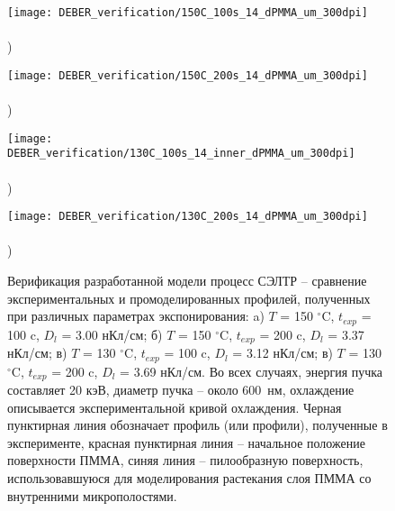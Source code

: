 \begin{figure}[h!]
	\begin{minipage}{0.48\textwidth}
		\texttt{[image: DEBER\_verification/150C\_100s\_14\_dPMMA\_um\_300dpi]} \\
		\vspace{-13em} \\ ) \\ \vspace{13em}
	\end{minipage}
	\begin{minipage}{0.48\textwidth}
		\texttt{[image: DEBER\_verification/150C\_200s\_14\_dPMMA\_um\_300dpi]} \\
		\vspace{-13em} \\ ) \\ \vspace{13em}
	\end{minipage}
	
	\vspace{-3.5em}
	
	\begin{minipage}{0.48\textwidth}
		\texttt{[image: DEBER\_verification/130C\_100s\_14\_inner\_dPMMA\_um\_300dpi]} \\
		\vspace{-13em} \\ ) \\ \vspace{13em}
	\end{minipage}
	\begin{minipage}{0.48\textwidth}
		\texttt{[image: DEBER\_verification/130C\_200s\_14\_dPMMA\_um\_300dpi]} \\
		\vspace{-13em} \\ ) \\ \vspace{13em}
	\end{minipage}
	\vspace{-3em}
	\caption{Верификация разработанной модели процесс СЭЛТР -- сравнение экспериментальных и промоделированных профилей, полученных при различных параметрах экспонирования: a) $T$ = 150 $^\circ$C, $t_{exp}$ = 100 c, $D_l$ = 3.00 нКл/см; б) $T$ = 150 $^\circ$C, $t_{exp}$ = 200 c, $D_l$ = 3.37 нКл/см; в) $T$ = 130 $^\circ$C, $t_{exp}$ = 100 c, $D_l$ = 3.12 нКл/см; в) $T$ = 130 $^\circ$C, $t_{exp}$ = 200 c, $D_l$ = 3.69 нКл/см. Во всех случаях, энергия пучка составляет 20 кэВ, диаметр пучка -- около 600~нм, охлаждение описывается экспериментальной кривой охлаждения. Черная пунктирная линия обозначает профиль (или профили), полученные в эксперименте, красная пунктирная линия -- начальное положение поверхности ПММА, синяя линия -- пилообразную поверхность, использовавшуюся для моделирования растекания слоя ПММА со внутренними микрополостями.}
	\label{fig:DEBER_4_profiles}
	\vspace{1em}
\end{figure}

